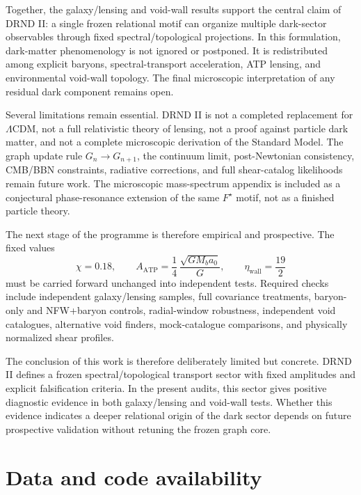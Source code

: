 \documentclass[12pt]{iopart}
\begin{document}
Together, the galaxy/lensing and void-wall results support the central claim of DRND II: a single frozen relational motif can organize multiple dark-sector observables through fixed spectral/topological projections. In this formulation, dark-matter phenomenology is not ignored or postponed. It is redistributed among explicit baryons, spectral-transport acceleration, ATP lensing, and environmental void-wall topology. The final microscopic interpretation of any residual dark component remains open.

Several limitations remain essential. DRND II is not a completed replacement for \(\Lambda\)CDM, not a full relativistic theory of lensing, not a proof against particle dark matter, and not a complete microscopic derivation of the Standard Model. The graph update rule \(G_n\to G_{n+1}\), the continuum limit, post-Newtonian consistency, CMB/BBN constraints, radiative corrections, and full shear-catalog likelihoods remain future work. The microscopic mass-spectrum appendix is included as a conjectural phase-resonance extension of the same \(F^\star\) motif, not as a finished particle theory.

The next stage of the programme is therefore empirical and prospective. The fixed values
\begin{equation}
\chi=0.18,
\qquad
A_{\mathrm{ATP}}
=
\frac14\,\frac{\sqrt{GM_ba_0}}{G},
\qquad
\eta_{\mathrm{wall}}=\frac{19}{2}
\end{equation}
must be carried forward unchanged into independent tests. Required checks include independent galaxy/lensing samples, full covariance treatments, baryon-only and NFW+baryon controls, radial-window robustness, independent void catalogues, alternative void finders, mock-catalogue comparisons, and physically normalized shear profiles.

The conclusion of this work is therefore deliberately limited but concrete. DRND II defines a frozen spectral/topological transport sector with fixed amplitudes and explicit falsification criteria. In the present audits, this sector gives positive diagnostic evidence in both galaxy/lensing and void-wall tests. Whether this evidence indicates a deeper relational origin of the dark sector depends on future prospective validation without retuning the frozen graph core.

\section*{Data and code availability}
\label{sec:data_and_code_availability}
\end{document}
